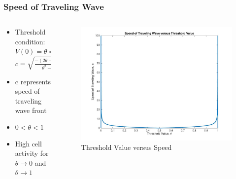 \documentclass{beamer}
\begin{document}
\begin{frame}
\frametitle{Speed of Traveling Wave}
\begin{columns}
\begin{column}{.5\textwidth}
\begin{itemize}
	\item Threshold condition: $V(0)=\theta \Rightarrow$\\$c=\sqrt{\frac{-(2\theta-1)^2}{\theta^2-\theta}}$
	\item c represents speed of traveling wave front
	\item $0<\theta<1$
	\item High cell activity for $\theta\rightarrow0$ and $\theta\rightarrow1$
\end{itemize}
\end{column}
\begin{column}{.6\textwidth}
\begin{figure}
\includegraphics[scale=0.17]{thresholdSpeed1}
\caption{Threshold Value versus Speed}
\end{figure}
\end{column}
\end{columns}
\end{frame}
\end{document}
